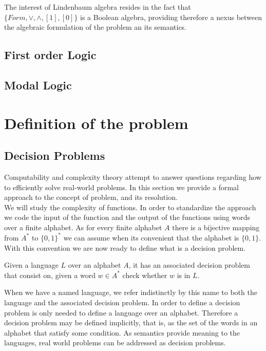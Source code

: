 The interest of Lindenbaum algebra resides in the fact that $\{Form, \vee,\wedge,[1],[0]\}$ is a Boolean algebra, providing therefore a nexus between the algebraic formulation of the problem an its semantics.



\section{First order Logic}

\section{Modal Logic}


\chapter{Definition of the problem}
\section{Decision Problems}
Computability and complexity theory attempt to answer questions regarding how to efficiently solve real-world problems. In this section we provide a formal approach to the concept of problem, and its resolution.\\

We will study the complexity of functions. In order to standardize the approach we code the input of the function and the output of the functions using words over a finite alphabet. As for every finite alphabet $A$ there is a bijective mapping from $A^*$ to $\{0,1\}^*$ we can assume when its convenient that the alphabet is $\{0,1\}$. With this convention we are now ready to define what is a decision problem.

\begin{definition}
  Given a language $L$ over an alphabet $A$, it has an associated decision problem that consist on, given a word $w\in A^*$ check whether $w$ is in $L$. 	
\end{definition}


When we have a named language, we refer indistinctly by this name to both the language and the associated decision problem. In order to define a decision problem is only needed to define a language over an alphabet. Therefore a decision problem may be defined implicitly, that is, as the set of the words in an alphabet that satisfy some condition. As semantics provide meaning to the languages, real world problems can be addressed as decision problems.

